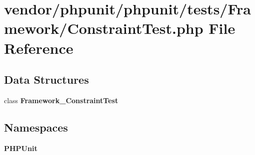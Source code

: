 \section{vendor/phpunit/phpunit/tests/\+Framework/\+Constraint\+Test.php File Reference}
\label{_constraint_test_8php}
\subsection*{Data Structures}
\begin{DoxyCompactItemize}
\item 
class {\bf Framework\+\_\+\+Constraint\+Test}
\end{DoxyCompactItemize}
\subsection*{Namespaces}
\begin{DoxyCompactItemize}
\item 
 {\bf P\+H\+P\+Unit}
\end{DoxyCompactItemize}
